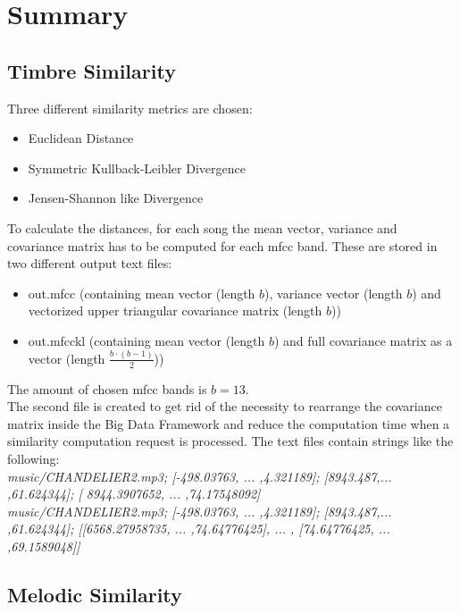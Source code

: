 \section{Summary}\label{sumfeat}

\subsection{Timbre Similarity}

Three different similarity metrics are chosen: 
\begin{itemize}
	\setlength\itemsep{-0.5em}
	\item Euclidean Distance
	\item Symmetric Kullback-Leibler Divergence
	\item Jensen-Shannon like Divergence
\end{itemize}
To calculate the distances, for each song the mean vector, variance and covariance matrix has to be computed for each mfcc band. These are stored in two different output text files: 
\begin{itemize}
	\setlength\itemsep{-0.5em}
	\item out.mfcc (containing mean vector (length $b$), variance vector (length $b$) and vectorized upper triangular covariance matrix (length $b$))
	\item out.mfcckl (containing mean vector (length $b$) and full covariance matrix as a vector (length $\frac{b \cdot (b-1)}{2}$))
\end{itemize}
The amount of chosen mfcc bands is $b = 13$.\\
The second file is created to get rid of the necessity to rearrange the covariance matrix inside the Big Data Framework and reduce the computation time when a similarity computation request is processed.
The text files contain strings like the following:\\
\textit{music/CHANDELIER2.mp3; [-498.03763,  ... ,4.321189]; [8943.487,... ,61.624344]; [ 8944.3907652, ... ,74.17548092]}\\
\textit{music/CHANDELIER2.mp3; [-498.03763,  ... ,4.321189]; [8943.487,... ,61.624344]; [[6568.27958735, ... ,74.64776425], ... , [74.64776425, ... ,69.1589048]]}

\subsection{Melodic Similarity}

